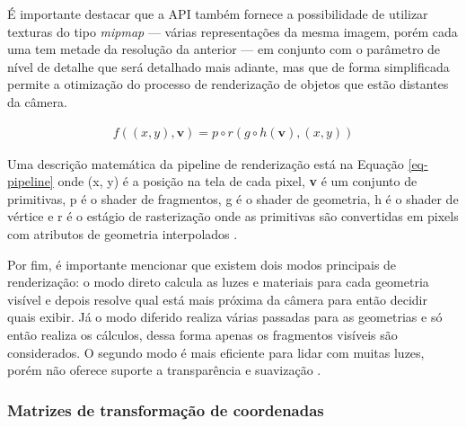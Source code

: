 É importante destacar que a API também fornece a possibilidade de utilizar texturas do tipo \textit{mipmap} --- várias representações da mesma imagem, porém cada uma tem metade da resolução da anterior --- em conjunto com o parâmetro de nível de detalhe que será detalhado mais adiante, mas que de forma simplificada permite a otimização do processo de renderização de objetos que estão distantes da câmera. 

\begin{equation} \label{eq-pipeline}
	\begin{aligned}
		f((x,y), \mathbf{v})=p \circ r(g \circ h(\mathbf{v}), (x,y)) 
	\end{aligned}
\end{equation}

Uma descrição matemática da pipeline de renderização está na Equação \ref{eq-pipeline} onde (x, y) é a posição na tela de cada pixel, \textbf{v} é um conjunto de primitivas, p é o shader de fragmentos, g é o shader de geometria, h é o shader de vértice e r é o estágio de rasterização onde as primitivas são convertidas em pixels com atributos de geometria interpolados \cite{wang2014auto}.

Por fim, é importante mencionar que existem dois modos principais de renderização: o modo direto calcula as luzes e materiais para cada geometria visível e depois resolve qual está mais próxima da câmera para então decidir quais exibir. Já o modo diferido realiza várias passadas para as geometrias e só então realiza os cálculos, dessa forma apenas os fragmentos visíveis são considerados. O segundo modo é mais eficiente para lidar com muitas luzes, porém não oferece suporte a transparência e suavização \cite{vsmid2017comparison}.

\subsubsection{Matrizes de transformação de coordenadas}
\label{sec:matrizes-transformacao-coordenadas}

\begin{figure}[htp]
	\centering
\end{figure}
\nocite{spaces}

